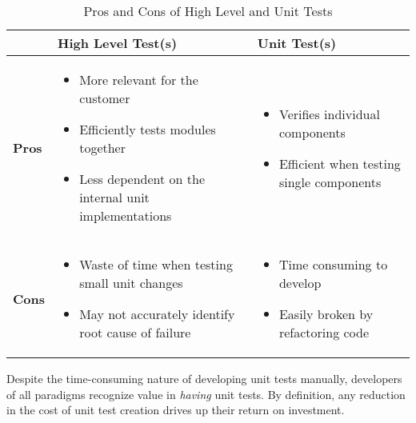 \documentclass[10pt, conference]{IEEEtran}
\begin{document}
\begin{table}[htbp]
    \caption{Pros and Cons of High Level and Unit Tests}
    \begin{center}
    \begin{tabular}{|>{\centering\arraybackslash}m{0.6cm}|>{\centering\arraybackslash}m{3.4cm}|>{\centering\arraybackslash}m{3.4cm}|}
        \hline
        \multirow{2}{*}{} & \textbf{High Level Test(s)} & \textbf{Unit Test(s)} \\
        \hline
        \textbf{Pros} & \begin{itemize}[leftmargin=*]
            \item More relevant for the customer
            \item Efficiently tests modules together
            \item Less dependent on the internal unit implementations
        \end{itemize} & \begin{itemize}[leftmargin=*]
            \item Verifies individual components
            \item Efficient when testing single components
        \end{itemize} \\
        \hline
        \textbf{Cons} & \begin{itemize}[leftmargin=*]
            \item Waste of time when testing small unit changes
            \item May not accurately identify root cause of failure
        \end{itemize} & \begin{itemize}[leftmargin=*]
            \item Time consuming to develop
            \item Easily broken by refactoring code
        \end{itemize} \\
        \hline
    \end{tabular}
    \label{tab1}
    \end{center}
\end{table}

Despite the time-consuming nature of developing unit tests manually, developers of all paradigms
recognize value in \textit{having} unit tests. By definition, any reduction in the cost of unit test creation drives 
up their return on investment.
\end{document}
